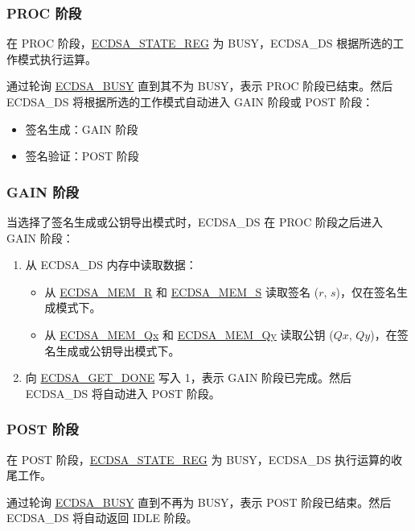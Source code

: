 \documentclass[main\_\_CN.tex]{subfiles}
\begin{document}
\subsubsection{PROC 阶段}

在 PROC 阶段，\hyperref[regdesc:ECDSASTATEREG]{ECDSA\_STATE\_REG} 为 BUSY，ECDSA\_DS 根据所选的工作模式执行运算。

通过轮询 \hyperref[fielddesc:ECDSABUSY]{ECDSA\_BUSY} 直到其不为 BUSY，表示 PROC 阶段已结束。然后 ECDSA\_DS 将根据所选的工作模式自动进入 GAIN 阶段或 POST 阶段：
\begin{itemize}
    \item 签名生成：GAIN 阶段
    \item 签名验证：POST 阶段
 \end{itemize}

\subsubsection{GAIN 阶段}

当选择了签名生成或公钥导出模式时，ECDSA\_DS 在 PROC 阶段之后进入 GAIN 阶段：

\begin{enumerate}
	\item 从 ECDSA\_DS 内存中读取数据：
	      \begin{itemize}
		      \item 从 \hyperref[tab:ecdsa-memory]{ECDSA\_MEM\_R} 和 \hyperref[tab:ecdsa-memory]{ECDSA\_MEM\_S} 读取签名 ($r$, $s$)，仅在签名生成模式下。
		      \item 从 \hyperref[tab:ecdsa-memory]{ECDSA\_MEM\_Qx} 和 \hyperref[tab:ecdsa-memory]{ECDSA\_MEM\_Qy} 读取公钥 ($Qx$, $Qy$)，在签名生成或公钥导出模式下。
	      \end{itemize}
	\item 向 \hyperref[fielddesc:ECDSAGETDONE]{ECDSA\_GET\_DONE} 写入 1，表示 GAIN 阶段已完成。然后 ECDSA\_DS 将自动进入 POST 阶段。
\end{enumerate}

\subsubsection{POST 阶段}

在 POST 阶段，\hyperref[regdesc:ECDSASTATEREG]{ECDSA\_STATE\_REG} 为 BUSY，ECDSA\_DS 执行运算的收尾工作。

通过轮询 \hyperref[fielddesc:ECDSABUSY]{ECDSA\_BUSY} 直到不再为 BUSY，表示 POST 阶段已结束。然后 ECDSA\_DS 将自动返回 IDLE 阶段。
\end{document}
